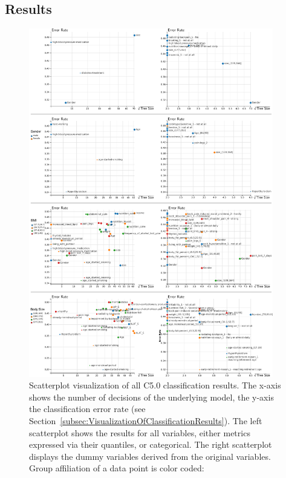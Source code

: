 \documentclass[a4paper,twoside]{style/article}
\begin{document}
\subsection{Results}
\begin{figure}[p!]
  \centering
  \includegraphics[width=0.95\textwidth]{figures/results}
  \caption{
Scatterplot visualization of all C5.0 classification results.
The x-axis shows the number of decisions of the underlying model, the y-axis the classification error rate (see Section~\ref{subsec:VisualizationOfClassificationResults}).
The left scatterplot shows the results for all variables, either metrics expressed via their quantiles, or categorical.
The right scatterplot displays the dummy variables derived from the original variables.
Group affiliation of a data point is color coded:
}
\end{figure}
\end{document}

